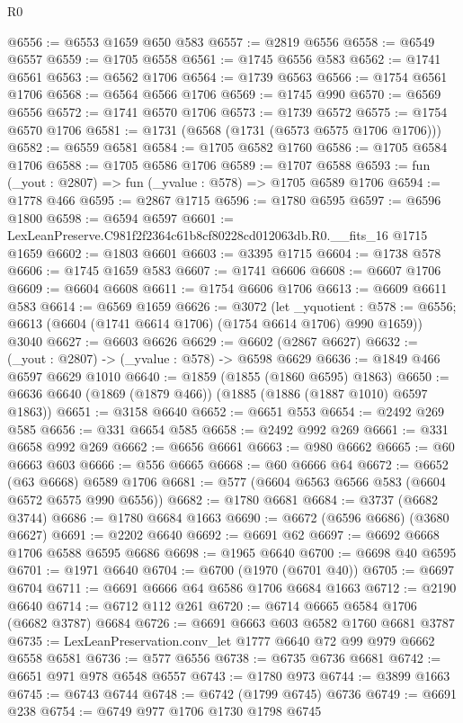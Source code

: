 \begin{lexlean}{R0}
\begin{coremodule}
@6556 := @6553 @1659 @650 @583
@6557 := @2819 @6556
@6558 := @6549 @6557
@6559 := @1705 @6558
@6561 := @1745 @6556 @583
@6562 := @1741 @6561
@6563 := @6562 @1706
@6564 := @1739 @6563
@6566 := @1754 @6561 @1706
@6568 := @6564 @6566 @1706
@6569 := @1745 @990
@6570 := @6569 @6556
@6572 := @1741 @6570 @1706
@6573 := @1739 @6572
@6575 := @1754 @6570 @1706
@6581 := @1731 (@6568 (@1731 (@6573 @6575 @1706 @1706)))
@6582 := @6559 @6581
@6584 := @1705 @6582 @1760
@6586 := @1705 @6584 @1706
@6588 := @1705 @6586 @1706
@6589 := @1707 @6588
@6593 := fun (_yout : @2807) => fun (_yvalue : @578) => @1705 @6589 @1706
@6594 := @1778 @466
@6595 := @2867 @1715
@6596 := @1780 @6595
@6597 := @6596 @1800
@6598 := @6594 @6597
@6601 := LexLeanPreserve.C981f2f2364c61b8cf80228cd012063db.R0.__fits_16 @1715 @1659
@6602 := @1803 @6601
@6603 := @3395 @1715
@6604 := @1738 @578
@6606 := @1745 @1659 @583
@6607 := @1741 @6606
@6608 := @6607 @1706
@6609 := @6604 @6608
@6611 := @1754 @6606 @1706
@6613 := @6609 @6611 @583
@6614 := @6569 @1659
@6626 := @3072
    (let _yquotient : @578 := @6556;
    @6613 (@6604 (@1741 @6614 @1706) (@1754 @6614 @1706) @990 @1659))
    @3040
@6627 := @6603 @6626
@6629 := @6602 (@2867 @6627)
@6632 := (_yout : @2807) -> (_yvalue : @578) -> @6598 @6629
@6636 := @1849 @466 @6597 @6629 @1010
@6640 := @1859 (@1855 (@1860 @6595) @1863)
@6650 := @6636 @6640 (@1869 (@1879 @466)) (@1885 (@1886 (@1887 @1010) @6597 @1863))
@6651 := @3158 @6640
@6652 := @6651 @553
@6654 := @2492 @269 @585
@6656 := @331 @6654 @585
@6658 := @2492 @992 @269
@6661 := @331 @6658 @992 @269
@6662 := @6656 @6661
@6663 := @980 @6662
@6665 := @60 @6663 @603
@6666 := @556 @6665
@6668 := @60 @6666 @64
@6672 := @6652 (@63 @6668) @6589 @1706
@6681 := @577 (@6604 @6563 @6566 @583 (@6604 @6572 @6575 @990 @6556))
@6682 := @1780 @6681
@6684 := @3737 (@6682 @3744)
@6686 := @1780 @6684 @1663
@6690 := @6672 (@6596 @6686) (@3680 @6627)
@6691 := @2202 @6640
@6692 := @6691 @62
@6697 := @6692 @6668 @1706 @6588 @6595 @6686
@6698 := @1965 @6640
@6700 := @6698 @40 @6595
@6701 := @1971 @6640
@6704 := @6700 (@1970 (@6701 @40))
@6705 := @6697 @6704
@6711 := @6691 @6666 @64 @6586 @1706 @6684 @1663
@6712 := @2190 @6640
@6714 := @6712 @112 @261
@6720 := @6714 @6665 @6584 @1706 (@6682 @3787) @6684
@6726 := @6691 @6663 @603 @6582 @1760 @6681 @3787
@6735 := LexLeanPreservation.conv_let @1777 @6640 @72 @99 @979 @6662 @6558 @6581
@6736 := @577 @6556
@6738 := @6735 @6736 @6681
@6742 := @6651 @971 @978 @6548 @6557
@6743 := @1780 @973
@6744 := @3899 @1663
@6745 := @6743 @6744
@6748 := @6742 (@1799 @6745) @6736
@6749 := @6691 @238
@6754 := @6749 @977 @1706 @1730 @1798 @6745

\end{coremodule}
\end{lexlean}
